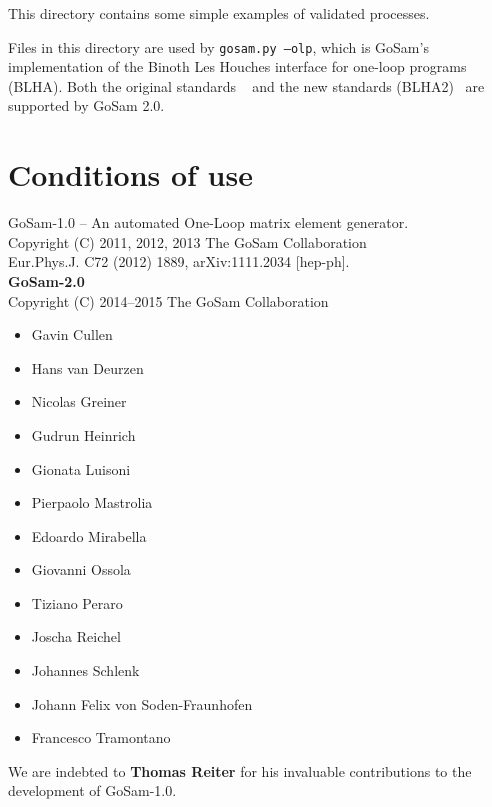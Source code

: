 \documentclass[11pt,a4paper]{refrep}
\newcommand{\gosamversion}{{2{.}0}}
\newcommand{\gosamv}[1][\gosamversion]{{\sc GoSam}\xspace}
\begin{document}
 This directory contains some simple examples
of validated processes.

 Files in this directory are used by
\texttt{gosam.py --olp}, which is \gosamv's implementation of the
Binoth Les Houches interface for one-loop programs (BLHA).
Both the original standards ~\cite{Binoth:2010xt} and the new standards 
(BLHA2)~\cite{Alioli:2013nda} are supported by \gosamv2.0.



\chapter*{Conditions of use}
    GoSam-1.0 -- An automated One-Loop matrix element generator.\\
    Copyright (C) 2011, 2012, 2013  The GoSam Collaboration\\
    Eur.Phys.J. C72 (2012) 1889, arXiv:1111.2034 [hep-ph].\\
    
    {\bf GoSam-2.0}  \\
    Copyright (C) 2014--2015  The GoSam Collaboration
     \begin{itemize}               
                \item Gavin Cullen
		\item Hans van Deurzen
                \item Nicolas Greiner
                \item Gudrun Heinrich
                \item Gionata Luisoni
                \item Pierpaolo Mastrolia
		\item Edoardo Mirabella
                \item Giovanni Ossola
		\item Tiziano Peraro
		\item Joscha Reichel
		\item Johannes Schlenk
		\item Johann Felix von Soden-Fraunhofen
                \item Francesco Tramontano
    \end{itemize}
   
    We are indebted to {\bf Thomas Reiter} for his invaluable contributions 
    to the development of GoSam-1.0.
\end{document}
